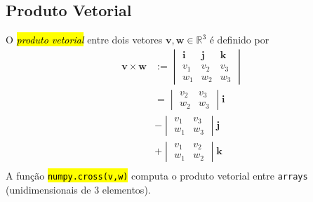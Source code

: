 \subsection{Produto Vetorial}

O \hl{\emph{produto vetorial}} entre dois vetores $\pmb{v}, \pmb{w}\in\mathbb{R}^3$ é definido por
\begin{subequations}
  \begin{align}
    \pmb{v}\times\pmb{w} &:=
                           \begin{vmatrix}
                             \pmb{i} & \pmb{j} & \pmb{k}\\
                             v_1 & v_2 & v_3\\
                             w_1 & w_2 & w_3
                           \end{vmatrix}\\
                         &=
                           \begin{vmatrix}
                             v_2 & v_3\\
                             w_2 & w_3
                           \end{vmatrix}\pmb{i}\\
                         &- \begin{vmatrix}
                             v_1 & v_3\\
                             w_1 & w_3
                           \end{vmatrix}\pmb{j}\\
                         &+ \begin{vmatrix}
                             v_1 & v_2\\
                             w_1 & w_2
                           \end{vmatrix}\pmb{k}\\
  \end{align}
\end{subequations}
A função \hl{{\lstinline+numpy.cross(v,w)+}} computa o produto vetorial entre \lstinline+arrays+ (unidimensionais de 3 elementos).

